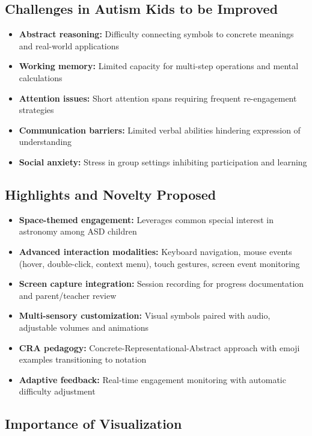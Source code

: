 \documentclass[11pt, a4paper]{article}
\begin{document}
\subsection{Challenges in Autism Kids to be Improved}

\begin{itemize}[leftmargin=*, itemsep=3pt, topsep=5pt]
    \item \textbf{Abstract reasoning:} Difficulty connecting symbols to concrete meanings and real-world applications
    \item \textbf{Working memory:} Limited capacity for multi-step operations and mental calculations
    \item \textbf{Attention issues:} Short attention spans requiring frequent re-engagement strategies
    \item \textbf{Communication barriers:} Limited verbal abilities hindering expression of understanding
    \item \textbf{Social anxiety:} Stress in group settings inhibiting participation and learning
\end{itemize}

\subsection{Highlights and Novelty Proposed}

\begin{itemize}[leftmargin=*, itemsep=3pt, topsep=5pt]
    \item \textbf{Space-themed engagement:} Leverages common special interest in astronomy among ASD children
    \item \textbf{Advanced interaction modalities:} Keyboard navigation, mouse events (hover, double-click, context menu), touch gestures, screen event monitoring
    \item \textbf{Screen capture integration:} Session recording for progress documentation and parent/teacher review
    \item \textbf{Multi-sensory customization:} Visual symbols paired with audio, adjustable volumes and animations
    \item \textbf{CRA pedagogy:} Concrete-Representational-Abstract approach with emoji examples transitioning to notation
    \item \textbf{Adaptive feedback:} Real-time engagement monitoring with automatic difficulty adjustment
\end{itemize}

\subsection{Importance of Visualization}
\end{document}
